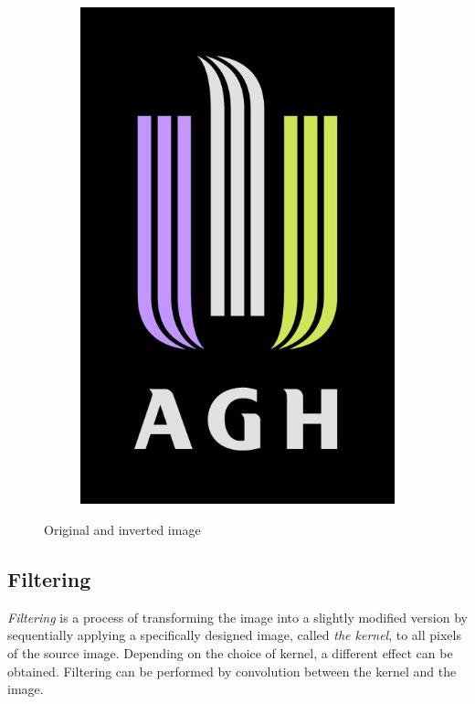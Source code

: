 \begin{figure}[H]
\begin{subfigure}[b]{0.15\textwidth}
        \includegraphics[width=\textwidth]{Content/Images/agh_logo_inverted.png}
    \end{subfigure}
    \caption{Original and inverted image \cite{agh_logo}}
\end{figure}

\subsection{Filtering}

\emph{Filtering} is a process of transforming the image into a slightly modified version by sequentially applying a specifically designed image, called \emph{the kernel}, to all pixels of the source image. Depending on the choice of kernel, a different effect can be obtained. Filtering can be performed by convolution between the kernel and the image. \cite{digital_image_processing}


